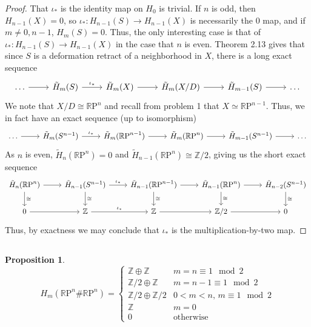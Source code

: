 \documentclass[english]{article}
\newcommand{\RR}{\mathbb{R}}
\newcommand{\ZZ}{\mathbb{Z}}
\newcommand{\prt}[1]{\setcounter{subsection}{#1-1}\subsection{}}
\newtheorem*{proposition*}{Proposition}
\theoremstyle{remark}
\theoremstyle{definition}
\newcommand{\tH}{\tilde{H}}
\newcommand{\RP}{{\RR\mathrm{P}}}
\begin{document}
\begin{proof}
	That $\iota_*$ is the identity map on $H_0$ is trivial. If $n$ is odd, then $H_{n-1}(X)=0$, so $\iota_*:H_{n-1}(S)\to H_{n-1}(X)$ is necessarily the 0 map, and if $m\neq 0,n-1$, $H_m(S)=0$. Thus, the only interesting case is that of $\iota_*:H_{n-1}(S)\to H_{n-1}(X)$ in the case that $n$ is even.
	Theorem 2.13 gives that since $S$ is a deformation retract of a neighborhood in $X$, there is a long exact sequence $$\begin{tikzcd}
	\ldots \arrow[r]&\tH_m(S)\arrow[r,"\iota_*"]&\tH_m(X)\arrow[r]&\tH_m(X/D)\arrow[r]&\tH_{m-1}(S)\arrow[r]&\ldots
	\end{tikzcd}$$
	We note that $X/D\cong \RP^n$ and recall from problem 1 that $X\simeq \RP^{n-1}$. Thus, we in fact have an exact sequence (up to isomorphism)
	$$\begin{tikzcd}
	\ldots \arrow[r]&\tH_m(S^{n-1})\arrow[r,"\iota_*"]&\tH_m(\RP^{n-1})\arrow[r]&\tH_m(\RP^n)\arrow[r]&\tH_{m-1}(S^{n-1})\arrow[r]&\ldots
	\end{tikzcd}$$
	As $n$ is even, $\tH_n(\RP^n)=0$ and $\tH_{n-1}(\RP^n)\cong\ZZ/2$, giving us the short exact sequence
		$$\begin{tikzcd}
\tH_n(\RP^n)\arrow[r]\arrow[d,"\cong"]&\tH_{n-1}(S^{n-1})\arrow[d,"\cong"]\arrow[r,"\iota_*"]&\tH_{n-1}(\RP^{n-1})\arrow[r]\arrow[d,"\cong"]&\tH_{n-1}(\RP^{n})\arrow[r]\arrow[d,"\cong"]&\tH_{n-2}(S^{n-1})\arrow[d,"\cong"]\\
0\arrow[r]&\ZZ\arrow[r,"\iota_*"]&\ZZ\arrow[r]&\ZZ/2\arrow[r]&0
	\end{tikzcd}$$
	Thus, by exactness we may conclude that $\iota_*$ is the multiplication-by-two map.
\end{proof}
\prt{3}\begin{proposition*}
	\begin{equation*}
		H_m(\RP^{n}\#\RP^n)=\begin{cases}
		\ZZ\oplus \ZZ& m=n\equiv 1\mod 2\\
		\ZZ/2\oplus \ZZ & m=n-1\equiv 1 \mod 2\\
		\ZZ/2 \oplus \ZZ/2 &0<m<n,\, m\equiv 1 \mod 2\\
		\ZZ& m=0\\
		0& \text{otherwise}
		\end{cases}
	\end{equation*}
\end{proposition*}
\end{document}

